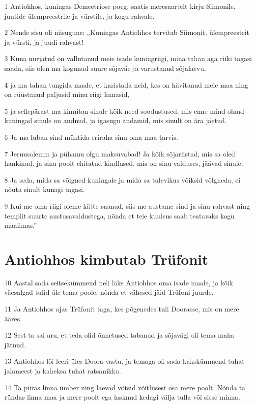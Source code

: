\par 1 Antiohhos, kuningas Demeetriose poeg, saatis meresaartelt kirju Siimonile, juutide ülempreestrile ja vürstile, ja kogu rahvale.
\par 2 Nende sisu oli niisugune: „Kuningas Antiohhos tervitab Siimonit, ülempreestrit ja vürsti, ja juudi rahvast!
\par 3 Kuna nurjatud on vallutanud meie isade kuningriigi, mina tahan aga riiki tagasi saada, siis olen ma kogunud suure sõjaväe ja varustanud sõjalaevu,
\par 4 ja ma tahan tungida maale, et karistada neid, kes on hävitanud meie maa ning on rüüstanud paljusid minu riigi linnasid,
\par 5 ja sellepärast ma kinnitan sinule kõik need soodustused, mis enne mind olnud kuningad sinule on andnud, ja igasugu andamid, mis sinult on ära jäetud.
\par 6 Ja ma luban sind müntida eriraha sinu oma maa tarvis.
\par 7 Jeruusalemm ja pühamu olgu maksuvabad! Ja kõik sõjariistad, mis sa oled hankinud, ja sinu poolt ehitatud kindlused, mis on sinu valduses, jäävad sinule.
\par 8 Ja seda, mida sa võlgned kuningale ja mida sa tulevikus võiksid võlgneda, ei nõuta sinult kunagi tagasi.
\par 9 Kui me oma riigi oleme kätte saanud, siis me austame sind ja sinu rahvast ning templit suurte austusavaldustega, nõnda et teie kuulsus saab teatavaks kogu maailmas.” 

\section*{Antiohhos kimbutab Trüfonit}

\par 10 Aastal sada seitsekümmend neli läks Antiohhos oma isade maale, ja kõik väesalgad tulid üle tema poole, nõnda et vähesed jäid Trüfoni juurde.
\par 11 Ja Antiohhos ajas Trüfonit taga, kes põgenedes tuli Doorasse, mis on mere ääres.
\par 12 Sest ta sai aru, et teda olid õnnetused tabanud ja sõjavägi oli tema maha jätnud.
\par 13 Antiohhos lõi leeri üles Doora vastu, ja temaga oli sada kakskümmend tuhat jalameest ja kaheksa tuhat ratsanikku.
\par 14 Ta piiras linna ümber ning laevad võtsid võitlusest osa mere poolt. Nõnda ta ründas linna maa ja mere poolt ega lasknud kedagi välja tulla või sisse minna. 

